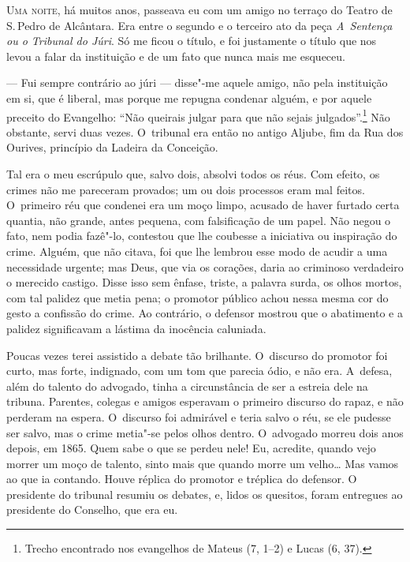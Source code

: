 \begin{linenumbers}

\textsc{Uma noite}, há muitos anos, passeava eu com um amigo no terraço do Teatro
de S.\,Pedro de Alcântara. Era entre o segundo e o terceiro ato da peça
\emph{A~Sentença ou o Tribunal do Júri}. Só me ficou o título, e foi
justamente o título que nos levou a falar da instituição e de um fato
que nunca mais me esqueceu.

--- Fui sempre contrário ao júri --- disse"-me aquele amigo, não pela
instituição em si, que é liberal, mas porque me repugna condenar alguém,
e por aquele preceito do Evangelho: ``Não queirais julgar para que não
sejais julgados''.\footnote{Trecho encontrado nos evangelhos de Mateus
  (7, 1--2) e Lucas (6, 37).} Não obstante, servi duas vezes. O~tribunal
era então no antigo Aljube, fim da Rua dos Ourives, princípio da Ladeira
da Conceição.

Tal era o meu escrúpulo que, salvo dois, absolvi todos os réus. Com
efeito, os crimes não me pareceram provados; um ou dois processos eram
mal feitos. O~primeiro réu que condenei era um moço limpo, acusado de
haver furtado certa quantia, não grande, antes pequena, com falsificação
de um papel. Não negou o fato, nem podia fazê"-lo, contestou que lhe
coubesse a iniciativa ou inspiração do crime. Alguém, que não citava,
foi que lhe lembrou esse modo de acudir a uma necessidade urgente; mas
Deus, que via os corações, daria ao criminoso verdadeiro o merecido
castigo. Disse isso sem ênfase, triste, a palavra surda, os olhos
mortos, com tal palidez que metia pena; o promotor público achou nessa
mesma cor do gesto a confissão do crime. Ao contrário, o defensor
mostrou que o abatimento e a palidez significavam a lástima da inocência
caluniada.

Poucas vezes terei assistido a debate tão brilhante. O~discurso do
promotor foi curto, mas forte, indignado, com um tom que parecia ódio, e
não era. A~defesa, além do talento do advogado, tinha a circunstância de
ser a estreia dele na tribuna. Parentes, colegas e amigos esperavam o
primeiro discurso do rapaz, e não perderam na espera. O~discurso foi
admirável e teria salvo o réu, se ele pudesse ser salvo, mas o crime
metia"-se pelos olhos dentro. O~advogado morreu dois anos depois, em
1865. Quem sabe o que se perdeu nele! Eu, acredite, quando vejo morrer
um moço de talento, sinto mais que quando morre um velho\ldots{} Mas vamos ao
que ia contando. Houve réplica do promotor e tréplica do defensor. O
presidente do tribunal resumiu os debates, e, lidos os quesitos, foram
entregues ao presidente do Conselho, que era eu.


\end{linenumbers}
